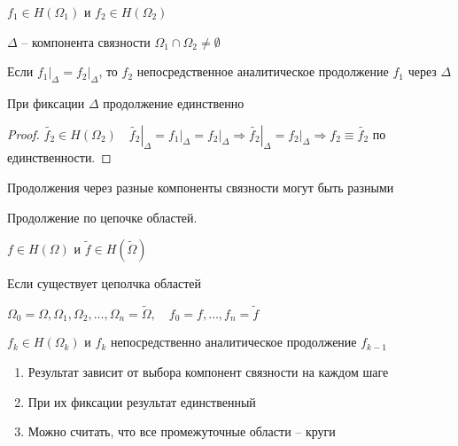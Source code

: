 
\begin{definition}\thmslashn
	
	$f_1 \in H(\Omega_1)$ и $f_2 \in H(\Omega_2)$
	
	$\Delta$ -- компонента связности $\Omega_1 \cap \Omega_2 \not = \emptyset$
	
	Если $\left.f_1\right|_{\Delta} = \left.f_2\right|_{\Delta}$, то $f_2$ непосредственное аналитическое продолжение $f_1$ через $\Delta$
	
\end{definition}

\begin{remark}\thmslashn

	При фиксации $\Delta$ продолжение единственно

\end{remark}

\begin{proof}\thmslashn
	
	$\widetilde{f_2} \in H(\Omega_2)\quad \left.\widetilde{f_2}\right|_{\Delta} = \left.f_1\right|_{\Delta} = \left.f_2\right|_{\Delta} \Rightarrow \left.\widetilde{f_2}\right|_{\Delta} =  \left.f_2\right|_{\Delta} \Rightarrow f_2 \equiv \widetilde{f_2}$ по единственности.
	
\end{proof}


\begin{remark}\thmslashn
	
	Продолжения через разные компоненты связности могут быть разными

\end{remark}


\begin{definition}Продолжение по цепочке областей.
	
	$f\in H(\Omega)$ и $\widetilde{f} \in H(\widetilde{\Omega})$ 
	
	Если существует цеполчка областей
	
	$\Omega_0 = \Omega, \Omega_1, \Omega_2, \ldots, \Omega_n = \widetilde{\Omega}, \quad f_0 = f, \ldots, f_n = \widetilde{f}$
	
	$f_k \in H(\Omega_k)$ и $f_k$ непосредственно аналитическое продолжение $f_{k-1}$
	
\end{definition}

\begin{remarks}\thmslashn
	
	\begin{enumerate}
		\item 
		Результат зависит от выбора компонент связности на каждом шаге
		
		\item
		При их фиксации результат единственный
		
		\item
		Можно считать, что все промежуточные области -- круги
		
	\end{enumerate}
	
\end{remarks}


